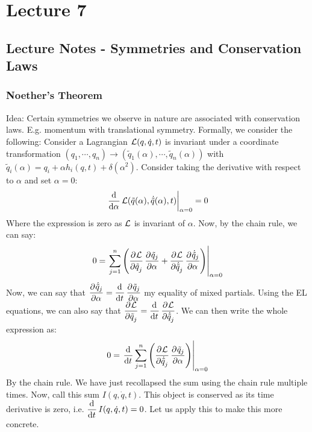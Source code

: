 \section{Lecture 7}
\subsection{Lecture Notes - Symmetries and Conservation Laws}
\subsubsection{Noether's Theorem}
Idea: Certain symmetries we observe in nature are associated with conservation laws. E.g. momentum with translational symmetry. Formally, we consider the following:
\newline Consider a Lagrangian $\mathcal{L}(q, \dot{q}, t)$ is invariant under a coordinate transformation $(q_1, \cdots, q_n) \rightarrow (\tilde{q}_1(\alpha), \cdots, \tilde{q}_n(\alpha))$ with $\tilde{q}_i(\alpha) = q_i + \alpha h_i(q,t) + \delta(\alpha^2)$. Consider taking the derivative with respect to $\alpha$ and set $\alpha = 0$:
\[\left.\dod{}{\alpha}\LL(\tilde{q}(\alpha), \dot{\tilde{q}}(\alpha), t)\right|_{\alpha = 0} = 0\]
Where the expression is zero as $\mathcal{L}$ is invariant of $\alpha$. Now, by the chain rule, we can say:
\[0 = \left. \sum_{j=1}^n\left(\dpd{\LL}{\tilde{q}_j}\dpd{\tilde{q}_j}{\alpha} + \dpd{\LL}{\dot{\tilde{q}}_j}\dpd{\dot{\tilde{q}}_j}{\alpha}\right)\right|_{\alpha=0}\]
Now, we can say that $\dpd{\dot{\tilde{q}}_j}{\alpha} = \dod{}{t}\dpd{\tilde{q}_j}{\alpha}$ my equality of mixed partials. Using the EL equations, we can also say that $\dpd{\LL}{\tilde{q}_j} = \dod{}{t}\dpd{\LL}{\dot{\tilde{q}}_j}$. We can then write the whole expression as:
\[0 = \left.\dod{}{t}\sum_{j=1}^n\left(\dpd{\LL}{\dot{\tilde{q}}_j}\dpd{\tilde{q}_j}{\alpha}\right)\right|_{\alpha=0}\]
By the chain rule. We have just recollapsed the sum using the chain rule multiple times. Now, call this sum $I(q, \dot{q}, t)$. This object is conserved as its time derivative is zero, i.e. $\dod{}{t}I(q, \dot{q}, t) = 0$. Let us apply this to make this more concrete. 
